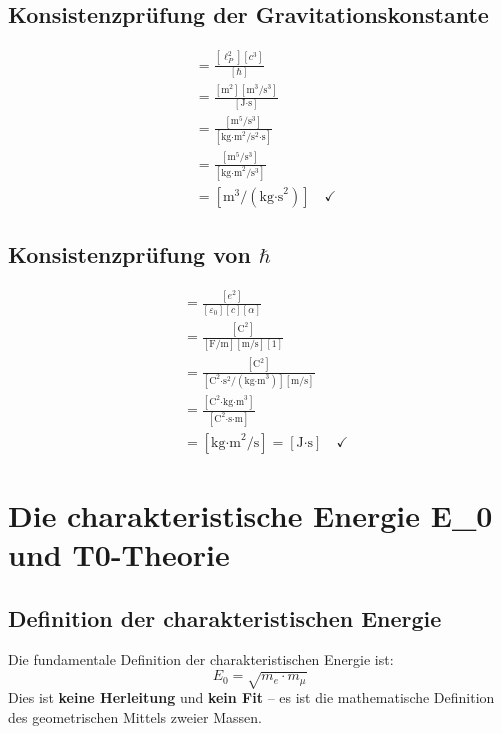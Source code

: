 	\subsection{Konsistenzprüfung der Gravitationskonstante}
	
	\begin{align}
		[G] &= \frac{[\ell_P^2][c^3]}{[\hbar]}\\
		&= \frac{[\text{m}^2][\text{m}^3/\text{s}^3]}{[\text{J·s}]}\\
		&= \frac{[\text{m}^5/\text{s}^3]}{[\text{kg·m}^2/\text{s}^2\text{·s}]}\\
		&= \frac{[\text{m}^5/\text{s}^3]}{[\text{kg·m}^2/\text{s}^3]}\\
		&= [\text{m}^3/(\text{kg·s}^2)] \quad \checkmark
	\end{align}
	
	\subsection{Konsistenzprüfung von $\hbar$}
	
	\begin{align}
		[\hbar] &= \frac{[e^2]}{[\varepsilon_0][c][\alpha]}\\
		&= \frac{[\text{C}^2]}{[\text{F/m}][\text{m/s}][1]}\\
		&= \frac{[\text{C}^2]}{[\text{C}^2\text{·s}^2/(\text{kg·m}^3)][\text{m/s}]}\\
		&= \frac{[\text{C}^2\text{·kg·m}^3]}{[\text{C}^2\text{·s·m}]}\\
		&= [\text{kg·m}^2/\text{s}] = [\text{J·s}] \quad \checkmark
	\end{align}
	
	\section{Die charakteristische Energie E\_0 und T0-Theorie}
	
	\subsection{Definition der charakteristischen Energie}
	
	\begin{tcolorbox}[colback=blue!5!white,colframe=blue!75!black,title=Grunddefinition]
		Die fundamentale Definition der charakteristischen Energie ist:
		\begin{equation}
			\boxed{E_0 = \sqrt{m_e \cdot m_\mu}}
		\end{equation}
		Dies ist \textbf{keine Herleitung} und \textbf{kein Fit} -- es ist die mathematische Definition des geometrischen Mittels zweier Massen.
	\end{tcolorbox}
	
